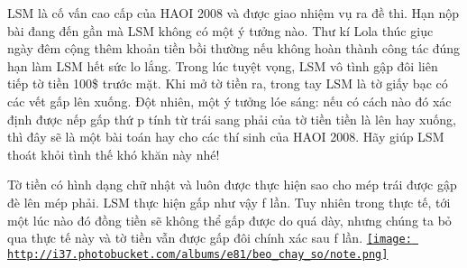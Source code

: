 LSM là cố vấn cao cấp của HAOI 2008 và được giao nhiệm vụ ra đề thi. Hạn nộp bài đang đến gần mà LSM không có một ý tưởng nào. Thư kí Lola thúc giục ngày đêm cộng thêm khoản tiền bồi thường nếu không hoàn thành công tác đúng hạn làm LSM hết sức lo lắng. Trong lúc tuyệt vọng, LSM vô tình gập đôi liên tiếp tờ tiền 100\$ trước mặt. Khi mở tờ tiền ra, trong tay LSM là tờ giấy bạc có các vết gấp lên xuống. Đột nhiên, một ý tưởng lóe sáng: nếu có cách nào đó xác định được nếp gấp thứ p tính từ trái sang phải của tờ tiền tiền là lên hay xuống, thì đây sẽ là một bài toán hay cho các thí sinh của HAOI 2008. Hãy giúp LSM thoát khỏi tình thế khó khăn này nhé!  

   Tờ tiền có hình dạng chữ nhật và luôn được thực hiện sao cho mép trái được gập đè lên mép phải. LSM thực hiện gấp như vậy f lần. Tuy nhiên trong thực tế, tới một lúc nào đó đồng tiền sẽ không thể gấp được do quá dày, nhưng chúng ta bỏ qua thực tế này và tờ tiền vẫn được gấp đôi chính xác sau f lần.  \href{http://s37.photobucket.com/albums/e81/beo_chay_so/?action=view&amp;current=note.png}{
\texttt{[image: http://i37.photobucket.com/albums/e81/beo\_chay\_so/note.png]}}